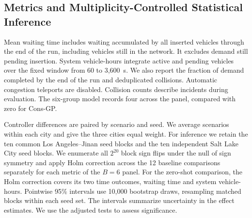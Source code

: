 \documentclass[letterpaper,journal]{IEEEtran}
\begin{document}
\subsection{Metrics and Multiplicity-Controlled Statistical Inference}
Mean waiting time includes waiting accumulated by all inserted vehicles through the end of the run, including vehicles still in the network. It excludes demand still pending insertion. System vehicle-hours integrate active and pending vehicles over the fixed window from 60 to 3,600~s. We also report the fraction of demand completed by the end of the run and deduplicated collisions. Automatic congestion teleports are disabled. Collision counts describe incidents during evaluation. The six-group model records four across the panel, compared with zero for Cons-GP.

Controller differences are paired by scenario and seed. We average scenarios within each city and give the three cities equal weight. For inference we retain the ten common Los Angeles--Jinan seed blocks and the ten independent Salt Lake City seed blocks. We enumerate all $2^{20}$ block sign flips under the null of sign symmetry and apply Holm correction across the 12 baseline comparisons separately for each metric of the $B=6$ panel. For the zero-shot comparison, the Holm correction covers its two time outcomes, waiting time and system vehicle-hours. Pointwise 95\% intervals use 10,000 bootstrap draws, resampling matched blocks within each seed set. The intervals summarize uncertainty in the effect estimates. We use the adjusted tests to assess significance.
\end{document}
